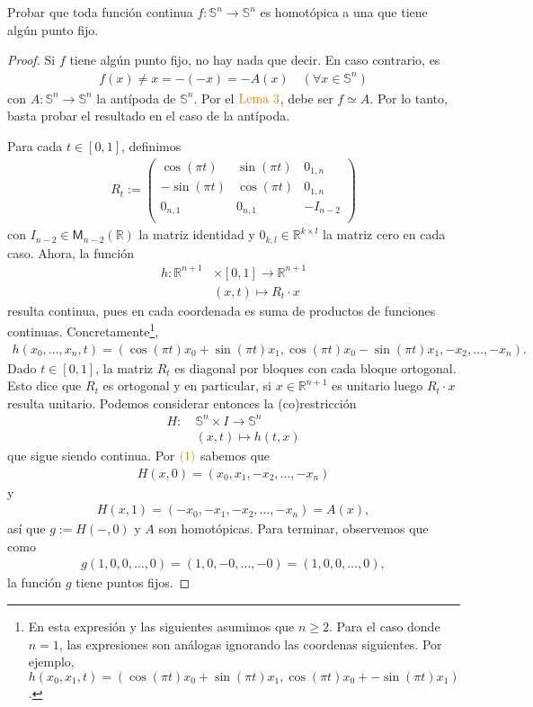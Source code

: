 \documentclass[11pt]{article}
\newcommand{\R}{\mathbb{R}}
\newcommand{\Ss}{\mathbb{S}}
\newcommand{\paint}[1]{\color{color}{#1}}
\newenvironment{exercise}[2][Ejercicio]{\begin{trivlist}
\item[\hskip \labelsep \paint{{\bfseries #1}}\hskip \labelsep {\bfseries #2.}]}{\end{trivlist}}
\begin{document}
\begin{exercise}{10} Probar que toda funci\'on continua $f : \Ss^n \to \Ss^n$ es homot\'opica a una que tiene alg\'un punto fijo.
\end{exercise}
\begin{proof} Si $f$ tiene alg\'un punto fijo, no hay nada que decir. En caso contrario, es
\begin{align*}
f(x) \neq x = -(-x) = -A(x) \quad  (\forall x \in \Ss^n)
\end{align*}
con $A : \Ss^n \to \Ss^n$ la ant\'ipoda de $\Ss^n$. Por el $\paint{\text{Lema $3$}}$, debe ser $f \simeq A$. Por lo tanto, basta probar el resultado en el caso de la ant\'ipoda. 

Para cada $t \in [0,1]$, definimos
\begin{align*}
R_t := \begin{pmatrix}
\cos(\pi t) & \sin(\pi t) & 0_{1,n}\\
-\sin(\pi t) & \cos(\pi t) & 0_{1,n}\\
0_{n,1} & 0_{n,1} & -I_{n-2}\\
\end{pmatrix}
\end{align*}
con $I_{n-2} \in \mathsf{M}_{n-2}(\R)$ la matriz identidad y $0_{k,l} \in \R^{k \times l}$ la matriz cero en cada caso. Ahora, la funci\'on
\begin{align*}
h : \R^{n+1}& \times [0,1] \to \mathbb{R}^{n+1}\\
&(x,t) \longmapsto R_t \cdot x
\end{align*}
resulta continua, pues en cada coordenada es suma de productos de funciones continuas. Concretamente\footnote{En esta expresi\'on y las siguientes asumimos que $n \geq 2$. Para el caso donde $n = 1$, las expresiones son an\'alogas ignorando las coordenas siguientes. Por ejemplo, $h(x_0,x_1,t) = (\cos(\pi t)x_0 + \sin(\pi t)x_1,\cos(\pi t)x_0+-\sin(\pi t)x_1)$.}, 
\begin{align}
h(x_0,\dots,x_n,t) = (\cos(\pi t)x_0 + \sin(\pi t)x_1,\cos(\pi t)x_0-\sin(\pi t)x_1,-x_2, \dots,-x_n).
\end{align}
Dado $t \in [0,1]$, la matriz $R_t$ es diagonal por bloques con cada bloque ortogonal. Esto dice que $R_t$ es ortogonal y en particular, si $x \in \R^{n+1}$ es unitario luego $R_t \cdot x$ resulta unitario. Podemos considerar entonces la (co)restricci\'on 
\begin{align*}
H : \ &\Ss^n \times I \to \Ss^n\\
&(x,t) \longmapsto h(t,x)
\end{align*}
que sigue siendo continua. Por $\paint{(1)}$ sabemos que
\begin{align*}
H(x,0) = (x_0,x_1,-x_2,\dots,-x_n)
\end{align*}
y
\begin{align*}
H(x,1) = (-x_0,-x_1,-x_2,\dots,-x_n) = A(x),
\end{align*}
as\'i que $g := H(-,0)$ y $A$ son homot\'opicas. Para terminar, observemos que como
\begin{align*}
g(1,0,0,\dots,0) = (1,0,-0,\dots,-0) = (1,0,0,\dots,0),
\end{align*}
la funci\'on $g$ tiene puntos fijos.
\end{proof}
\end{document}

